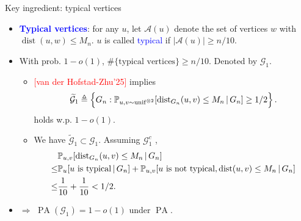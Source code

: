 \documentclass{beamer}
\theoremstyle{plain}
\theoremstyle{definition}
\begin{document}
\begin{frame}{Key ingredient: typical vertices}
    \begin{itemize}
        \item\pause \textbf{\textcolor{blue}{Typical vertices}}: for any $u$, let $\mathcal{A}(u)$ denote the set of vertices $w$ with $\operatorname{dist}(u,w)\leq M_n$. $u$ is called \textcolor{blue}{typical} if $|\mathcal{A}(u)|\geq n/10$.
        \item\pause With prob. $1-o(1)$, $\#\{\text{typical vertices}\}\geq n/10$. Denoted by $\mathcal{G}_1$.
        \begin{itemize}
            \item\pause \textcolor{red}{[van der Hofstad-Zhu'25]} implies 
            \begin{equation}
               \widetilde{\mathcal{G}}_1\triangleq \Big\{G_n: \mathbb P_{u,v\sim \operatorname{unif}^{\otimes 2}}[\operatorname{dist}_{G_n}(u,v)\leq M_n\,|\,G_n]\geq 1/2\Big\}\,.\notag
            \end{equation}
            holds w.p. $1-o(1)$.
            \item\pause We have $\widetilde{\mathcal{G}}_1\subset \mathcal{G}_1$. Assuming $\mathcal{G}_1^c$ ,
            \begin{equation}
            \begin{split}
                &\mathbb P_{u,v}[\operatorname{dist}_{G_n}(u,v)\leq M_n\,|\,G_n] \\
                \leq& \mathbb P_u[u \text{ is typical}\,|\,G_n]+\mathbb P_{u,v}[u \text{ is not typical}, \operatorname{dist}(u,v)\leq M_n\,|\,G_n]\\
                \leq&\frac{1}{10}+\frac{1}{10}<1/2.
            \end{split}\notag
            \end{equation}
        \end{itemize}
        \item\pause $\Rightarrow$ $\operatorname{PA}(\mathcal{G}_1)=1-o(1)$ under $\operatorname{PA}$.
    \end{itemize}
\end{frame}
\end{document}
